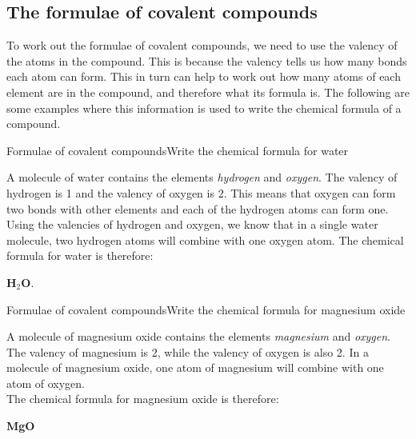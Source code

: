             \subsection{The formulae of covalent compounds}
            \nopagebreak
        \label{m38689*id143689}To work out the formulae of covalent compounds, we need to use the valency of the atoms in the compound. This is because the valency tells us how many bonds each atom can form. This in turn can help to work out how many atoms of each element are in the compound, and therefore what its formula is. The following are some examples where this information is used to write the chemical formula of a compound.\par 
\begin{wex}{Formulae of covalent compounds}{Write the chemical formula for water\\}
{
A molecule of water contains the elements \textit{hydrogen} and \textit{oxygen}.
The valency of hydrogen is 1 and the valency of oxygen is 2. This means that oxygen can form two bonds with other elements and each of the hydrogen atoms can form one.
Using the valencies of hydrogen and oxygen, we know that in a single water molecule, two hydrogen atoms will combine with one oxygen atom. The chemical formula for water is therefore:
\begin{center}
\textbf{H$_2$O}.
\end{center}}
\end{wex}

\begin{wex}{Formulae of covalent compounds}{Write the chemical formula for magnesium oxide\\}
{
 A molecule of magnesium oxide contains the elements \textit{magnesium} and \textit{oxygen}.  
The valency of magnesium is 
2, while the valency of oxygen is also 2. In a molecule of magnesium oxide, one atom of magnesium will combine with one atom 
of oxygen. \\
The chemical formula for magnesium oxide is therefore: 

\begin{center}
\textbf{MgO}
\end{center}}
\end{wex}

